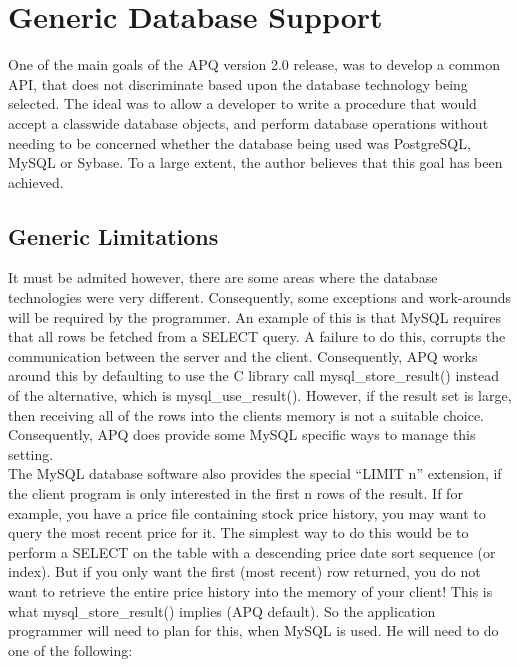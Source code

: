 \documentclass[english,letterpaper]{book}
\begin{document}
\section{Generic Database Support}

One of the main goals of the APQ version 2.0 release, was to develop
a common API, that does not discriminate based upon the database technology
being selected. The ideal was to allow a developer to write a procedure
that would accept a classwide database objects, and perform database
operations without needing to be concerned whether the database being
used was PostgreSQL, MySQL or Sybase.
To a large extent, the author believes that this goal has been achieved.


\subsection{Generic Limitations}

It must be admited however, there are some areas where the database
technologies were very different. Consequently, some exceptions and
work-arounds will be required by the programmer. An example of this
is that MySQL requires that all rows be fetched from a SELECT query.
A failure to do this, corrupts the communication between the server
and the client. Consequently, APQ works around this by defaulting
to use the C library call mysql\_store\_result() instead of the alternative,
which is mysql\_use\_result(). However, if the result set is large,
then receiving all of the rows into the clients memory is not a suitable
choice. Consequently, APQ does provide some MySQL specific ways to
manage this setting.\\ 

The MySQL database software also provides the special ``LIMIT n''
extension, if the client program is only interested in the first n
rows of the result. If for example, you have a price file containing
stock price history, you may want to query the most recent price for
it. The simplest way to do this would be to perform a SELECT on the
table with a descending price date sort sequence (or index). But if
you only want the first (most recent) row  returned, you do not want
to retrieve the entire price history into the memory of your client!
This is what mysql\_store\_result() implies (APQ default). So the
application programmer will need to plan for this, when MySQL is used.
He will need to do one of the following:
\end{document}
